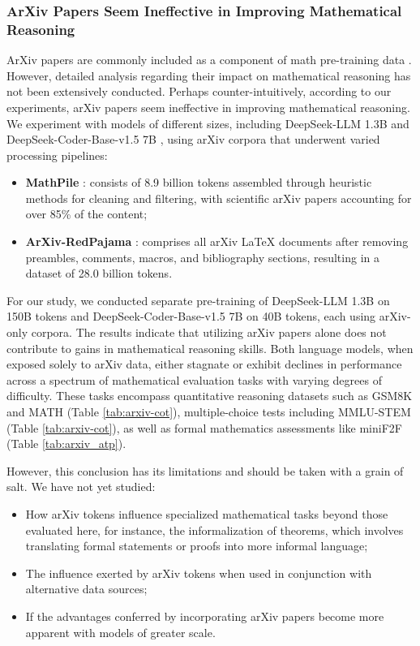 \begin{itemize}[topsep=0pt]
\begin{itemize}[topsep=0pt]
\subsubsection{ArXiv Papers Seem Ineffective in Improving Mathematical Reasoning}

ArXiv papers are commonly included as a component of math pre-training data \citep{minerva,gpt-f,llemma,mathpile}. However, detailed analysis regarding their impact on mathematical reasoning has not been extensively conducted. Perhaps counter-intuitively, according to our experiments, arXiv papers seem ineffective in improving mathematical reasoning. We experiment with models of different sizes, including DeepSeek-LLM 1.3B and DeepSeek-Coder-Base-v1.5 7B \citep{deepseek-coder}, using arXiv corpora that underwent varied processing pipelines:

\begin{itemize}[topsep=0pt]
    \item \textbf{MathPile} \citep{mathpile}: consists of 8.9 billion tokens assembled through heuristic methods for cleaning and filtering, with scientific arXiv papers accounting for over 85\% of the content;
    \item \textbf{ArXiv-RedPajama} \citep{redpajama}: comprises all arXiv LaTeX documents after removing preambles, comments, macros, and bibliography sections, resulting in a dataset of 28.0 billion tokens.
\end{itemize}

For our study, we conducted separate pre-training of DeepSeek-LLM 1.3B on 150B tokens and DeepSeek-Coder-Base-v1.5 7B on 40B tokens, each using arXiv-only corpora. The results indicate that utilizing arXiv papers alone does not contribute to gains in mathematical reasoning skills. Both language models, when exposed solely to arXiv data, either stagnate or exhibit declines in performance across a spectrum of mathematical evaluation tasks with varying degrees of difficulty. These tasks encompass quantitative reasoning datasets such as GSM8K and MATH (Table \ref{tab:arxiv-cot}), multiple-choice tests including MMLU-STEM (Table \ref{tab:arxiv-cot}), as well as formal mathematics assessments like miniF2F (Table \ref{tab:arxiv_atp}).

However, this conclusion has its limitations and should be taken with a grain of salt. We have not yet studied:

\begin{itemize}[topsep=0pt]
    \item How arXiv tokens influence specialized mathematical tasks beyond those evaluated here, for instance, the informalization of theorems, which involves translating formal statements or proofs into more informal language;
    \item The influence exerted by arXiv tokens when used in conjunction with alternative data sources;
    \item If the advantages conferred by incorporating arXiv papers become more apparent with models of greater scale.
\end{itemize}


\end{itemize}
\end{itemize}
